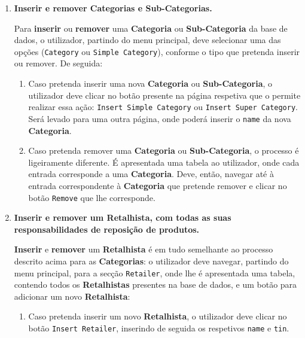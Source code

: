 \documentclass[12pt,a4paper]{article}
\begin{document}
  \begin{enumerate}
    \item \textbf{Inserir e remover Categorias e Sub-Categorias.}
    
    Para \textbf{inserir} ou \textbf{remover} uma \textbf{Categoria} ou \textbf{Sub-Categoria}
    da base de dados, o utilizador, partindo do menu principal, deve selecionar
    uma das opções (\texttt{Category} ou \texttt{Simple Category}), conforme o tipo
    que pretenda inserir ou remover. De seguida:

    \begin{enumerate}
      \item Caso pretenda inserir uma nova \textbf{Categoria} ou \textbf{Sub-Categoria},
      o utilizador deve clicar no botão presente na página respetiva que o permite
      realizar essa ação: \texttt{Insert Simple Category} ou \texttt{Insert Super Category}.
      Será levado para uma outra página, onde poderá inserir o \texttt{name} da nova
      \textbf{Categoria}.

      \item Caso pretenda remover uma \textbf{Categoria} ou \textbf{Sub-Categoria},
      o processo é ligeiramente diferente. É apresentada uma tabela ao utilizador,
      onde cada entrada corresponde a uma \textbf{Categoria}. Deve, então, navegar
      até à entrada correspondente à \textbf{Categoria} que pretende remover e
      clicar no botão \texttt{Remove} que lhe corresponde. 
    \end{enumerate}
    
    \item \textbf{Inserir e remover um Retalhista, com todas as suas responsabilidades
    de reposição de produtos.}
    
    \textbf{Inserir} e \textbf{remover} um \textbf{Retalhista} é em tudo semelhante ao processo
    descrito acima para as \textbf{Categorias}: o utilizador deve navegar,
    partindo do menu principal, para a secção \texttt{Retailer}, onde lhe é
    apresentada uma tabela, contendo todos os \textbf{Retalhistas} presentes na
    base de dados, e um botão para adicionar um novo \textbf{Retalhista}:

    \begin{enumerate}
      \item Caso pretenda inserir um novo \textbf{Retalhista}, o utilizador
      deve clicar no botão \texttt{Insert Retailer}, inserindo de seguida os respetivos
      \texttt{name} e \texttt{tin}.


\end{enumerate}
\end{enumerate}
\end{document}
